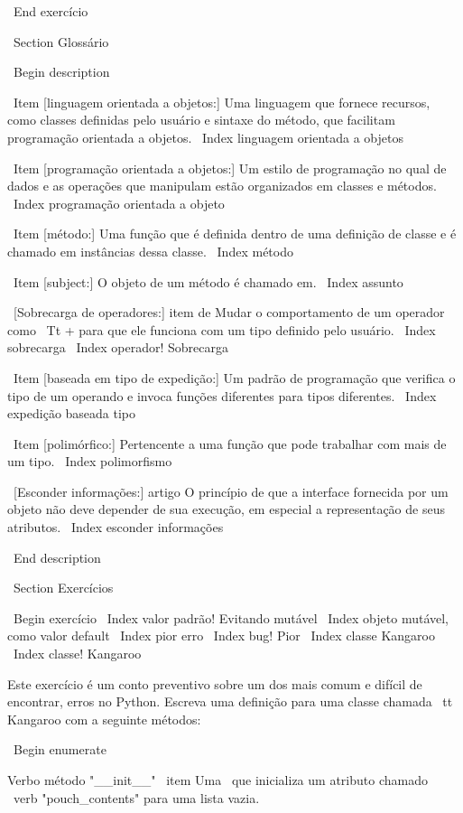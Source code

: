 \documentclass[10pt]{book}
\begin{document}
\begin {itemize}
{{{{{{{{{{{{{{\ End {} exercício


\ Section {} Glossário

\ Begin {description}

\ Item [linguagem orientada a objetos:] Uma linguagem que fornece recursos,
  como classes definidas pelo usuário e sintaxe do método, que facilitam
  programação orientada a objetos.
\ Index {linguagem orientada a objetos}

\ Item [programação orientada a objetos:] Um estilo de programação no qual
de dados e as operações que manipulam estão organizados em classes
e métodos.
\ Index {programação orientada a objeto}

\ Item [método:] Uma função que é definida dentro de uma definição de classe e
é chamado em instâncias dessa classe.
\ Index {método}

\ Item [subject:] O ​​objeto de um método é chamado em.
\ Index {assunto}

\ [Sobrecarga de operadores:] item de Mudar o comportamento de um operador como
{\ Tt +} para que ele funciona com um tipo definido pelo usuário.
\ Index {sobrecarga}
\ Index {operador! Sobrecarga}

\ Item [baseada em tipo de expedição:] Um padrão de programação que verifica o tipo
de um operando e invoca funções diferentes para tipos diferentes.
\ Index {expedição baseada tipo}

\ Item [polimórfico:] Pertencente a uma função que pode trabalhar com mais
  de um tipo.  
\ Index {polimorfismo}

\ [Esconder informações:] artigo O princípio de que a interface fornecida 
por um objeto não deve depender de sua execução, em especial
a representação de seus atributos.
\ Index {esconder informações}


\ End {description}

\ Section {Exercícios}

\ Begin {} exercício
\ Index {valor padrão! Evitando mutável}
\ Index {objeto mutável, como valor default}
\ Index {pior erro}
\ Index {bug! Pior}
\ Index {classe Kangaroo}
\ Index {classe! Kangaroo}

Este exercício é um conto preventivo sobre um dos mais
comum e difícil de encontrar, erros no Python.
Escreva uma definição para uma classe chamada {\ tt Kangaroo} com a seguinte
métodos:

\ Begin {enumerate}

Verbo método "__init__" \ item Uma \ que inicializa um atributo chamado 
\ verb "pouch_contents" para uma lista vazia.

}}}}}}}}}}}}}}
\end{itemize}
\end{document}
